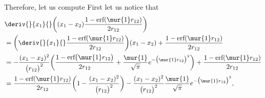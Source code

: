 Therefore, let us compute 
First let us notice that 
\begin{equation}
 \begin{aligned}
 \label{eq:d2_x1_2}
& \deriv{}{x_1}{}\bigg( (x_1 - x_2) \frac{1 - \text{erf}(\mur{1} r_{12})}{2 r_{12}} \bigg) \\
&=  \bigg( \deriv{}{x_1}{} \frac{1 - \text{erf}(\mur{1} r_{12})}{2 r_{12}}\bigg) (x_1 - x_2 ) +  \frac{1 - \text{erf}(\mur{1} r_{12})}{2 r_{12}}  \\
& = -\frac{(x_1 - x_2)^2}{\big( r_{12} \big)^2}\bigg(\frac{1 - \text{erf}\big( \mur{1} r_{12} \big)}{2 r_{12}}  + \frac{\mur{1}}{\sqrt{\pi}} e^{-\big(\mur{1} r_{12} \big)^2}   \bigg) +  \frac{1 - \text{erf}(\mur{1} r_{12})}{2 r_{12}} \\
& = \frac{1 - \text{erf}(\mur{1} r_{12})}{2 r_{12}} \bigg( 1 - \frac{(x_1 - x_2)^2}{\big( r_{12} \big)^2} \bigg) 
- \frac{(x_1 - x_2)^2}{\big( r_{12} \big)^2}\frac{\mur{1}}{\sqrt{\pi}} e^{-\big(\mur{1} r_{12} \big)^2},
 \end{aligned}
\end{equation}


